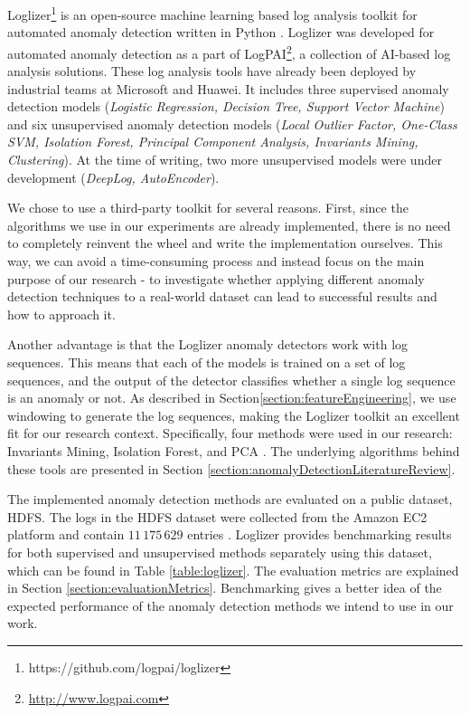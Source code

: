 Loglizer\footnote{https://github.com/logpai/loglizer} is an open-source machine learning based log analysis toolkit for automated anomaly detection written in Python \cite{he2016}. Loglizer was developed for automated anomaly detection as a part of LogPAI\footnote{\url{http://www.logpai.com}}, a collection of AI-based log analysis solutions. These log analysis tools have already been deployed by industrial teams at Microsoft and Huawei. It includes three supervised anomaly detection models (\textit{Logistic Regression, Decision Tree, Support Vector Machine}) and six unsupervised anomaly detection models (\textit{Local Outlier Factor, One-Class SVM, Isolation Forest, Principal Component Analysis, Invariants Mining, Clustering}). At the time of writing, two more unsupervised models were under development (\textit{DeepLog, AutoEncoder}). 

We chose to use a third-party toolkit for several reasons. First, since the algorithms we use in our experiments are already implemented, there is no need to completely reinvent the wheel and write the implementation ourselves. This way, we can avoid a time-consuming process and instead focus on the main purpose of our research - to investigate whether applying different anomaly detection techniques to a real-world dataset can lead to successful results and how to approach it.

Another advantage is that the Loglizer anomaly detectors work with log sequences. This means that each of the models is trained on a set of log sequences, and the output of the detector classifies whether a single log sequence is an anomaly or not. As described in Section\ref{section:featureEngineering}, we use windowing to generate the log sequences, making the Loglizer toolkit an excellent fit for our research context. Specifically, four methods were used in our research: Invariants Mining, Isolation Forest, and PCA . The underlying algorithms behind these tools are presented in Section \ref{section:anomalyDetectionLiteratureReview}.

The implemented anomaly detection methods are evaluated on a public dataset, HDFS. The logs in the HDFS dataset were collected from the Amazon EC2 platform and contain $11\,175\,629$ entries \cite{xu2009}. Loglizer provides benchmarking results for both supervised and unsupervised methods separately using this dataset, which can be found in Table \ref{table:loglizer}. The evaluation metrics are explained in Section \ref{section:evaluationMetrics}. Benchmarking gives a better idea of the expected performance of the anomaly detection methods we intend to use in our work.  

